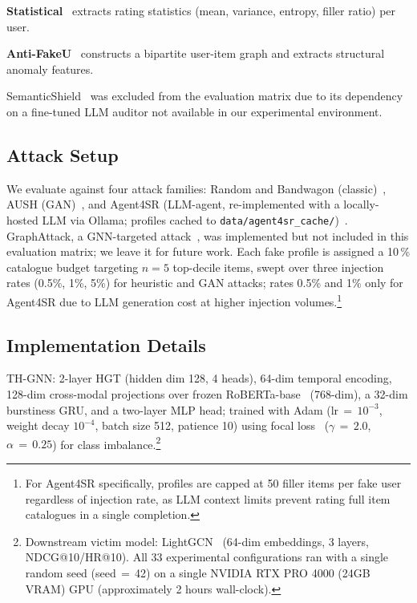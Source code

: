 \noindent\textbf{Statistical}~\cite{chirita2005preventing} extracts rating statistics (mean, variance, entropy, filler ratio) per user.

\noindent\textbf{Anti-FakeU}~\cite{you2023antifakeu} constructs a bipartite user-item graph and extracts structural anomaly features.

SemanticShield~\cite{li2025semanticshield} was excluded from the evaluation matrix due to its dependency on a fine-tuned LLM auditor not available in our experimental environment.

\subsection{Attack Setup}
\label{sec:attacks}

We evaluate against four attack families: Random and Bandwagon
(classic)~\cite{lam2004shilling,mobasher2007attacks}, AUSH
(GAN)~\cite{lin2020aush}, and Agent4SR (LLM-agent,
re-implemented with a locally-hosted LLM via Ollama; profiles cached to
\texttt{data/agent4sr\_cache/})~\cite{zhang2024agent4sr}. GraphAttack, a
GNN-targeted attack~\cite{wu2022graphattack}, was implemented but not
included in this evaluation matrix; we leave it for future work.
Each fake profile is assigned a 10\,\% catalogue budget targeting $n\!=\!5$
top-decile items, swept over three injection rates (0.5\%, 1\%, 5\%) for heuristic and GAN attacks; rates 0.5\% and 1\% only for Agent4SR due to LLM generation cost at higher injection volumes.\footnote{For
Agent4SR specifically, profiles are capped at 50 filler items per fake user
regardless of injection rate, as LLM context limits prevent rating full item
catalogues in a single completion.}

\subsection{Implementation Details}
\label{sec:impl}

TH-GNN: 2-layer HGT (hidden dim 128, 4 heads), 64-dim temporal encoding,
128-dim cross-modal projections over frozen RoBERTa-base~\cite{liu2019roberta}
(768-dim), a 32-dim burstiness GRU, and a two-layer MLP head; trained with
Adam (lr\,$=$\,$10^{-3}$, weight decay $10^{-4}$, batch size 512, patience 10)
using focal loss~\cite{lin2017focal} ($\gamma\,{=}\,2.0$, $\alpha\,{=}\,0.25$)
for class imbalance.\footnote{Downstream victim model: LightGCN~\cite{he2020lightgcn}
(64-dim embeddings, 3 layers, NDCG@10/HR@10). All 33 experimental configurations
ran with a single random seed (seed\,$=$\,42) on a single NVIDIA RTX PRO 4000
(24GB VRAM) GPU (approximately 2 hours wall-clock).}

